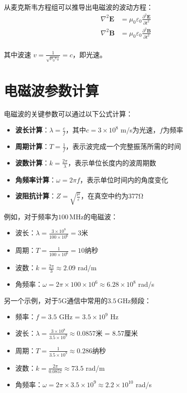 \documentclass[12pt,UTF8]{ctexbook}
\begin{document}
从麦克斯韦方程组可以推导出电磁波的波动方程：
\begin{align}
\nabla^2 \mathbf{E} &= \mu_0\varepsilon_0 \frac{\partial^2 \mathbf{E}}{\partial t^2} \\
\nabla^2 \mathbf{B} &= \mu_0\varepsilon_0 \frac{\partial^2 \mathbf{B}}{\partial t^2} \\ 
\end{align}

其中波速 $v = \frac{1}{\sqrt{\mu_0\varepsilon_0}} = c$，即光速。

\section{电磁波参数计算}

电磁波的关键参数可以通过以下公式计算：

\begin{itemize}[leftmargin=3.5em]
    \item \textbf{波长计算}：$\lambda = \frac{c}{f}$，其中$c=3\times10^8$ m/s为光速，$f$为频率
    \item \textbf{周期计算}：$T = \frac{1}{f}$，表示波完成一个完整振荡所需的时间
    \item \textbf{波数计算}：$k = \frac{2\pi}{\lambda}$，表示单位长度内的波周期数
    \item \textbf{角频率计算}：$\omega = 2\pi f$，表示单位时间内的角度变化
    \item \textbf{波阻抗计算}：$Z = \sqrt{\frac{\mu}{\varepsilon}}$，在真空中约为377Ω
\end{itemize}

例如，对于频率为$100\,\text{MHz}$的电磁波：
\begin{itemize}[leftmargin=3.5em]
    \item 波长：$\lambda = \frac{3\times10^8}{100\times10^6} = 3$米
    \item 周期：$T = \frac{1}{100\times10^6} = 10$纳秒
    \item 波数：$k = \frac{2\pi}{3} \approx 2.09$ rad/m
    \item 角频率：$\omega = 2\pi \times 100\times10^6 \approx 6.28\times10^8$ rad/s
\end{itemize}

另一个示例，对于5G通信中常用的$3.5\,\text{GHz}$频段：
\begin{itemize}[leftmargin=3.5em]
    \item 频率：$f = 3.5$ GHz = $3.5\times10^9$ Hz
    \item 波长：$\lambda = \frac{3\times10^8}{3.5\times10^9} \approx 0.0857$米 = 8.57厘米
    \item 周期：$T = \frac{1}{3.5\times10^9} \approx 0.286$纳秒
    \item 波数：$k = \frac{2\pi}{0.0857} \approx 73.5$ rad/m
    \item 角频率：$\omega = 2\pi \times 3.5\times10^9 \approx 2.2\times10^{10}$ rad/s
\end{itemize}
\end{document}
